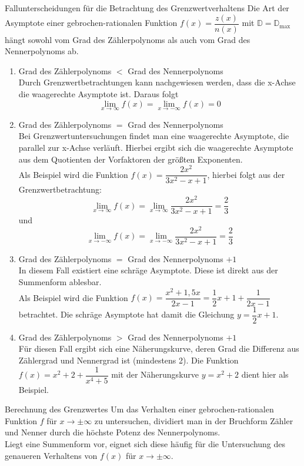 \begin{merke}{Fallunterscheidungen für die Betrachtung des Grenzwertverhaltens}{}
Die Art der Asymptote einer gebrochen-rationalen Funktion $f(x)=\dfrac{z(x)}{n(x)}$ mit $\mathds{D} = \mathds{D}_{\text{max}}$ hängt sowohl vom Grad des Zählerpolynoms als auch vom Grad des Nennerpolynoms ab.
\begin{enumerate}
    \item Grad des Zählerpolynoms $<$ Grad des Nennerpolynoms\\
    Durch Grenzwertbetrachtungen kann nachgewiesen werden, dass die x-Achse die waagerechte Asymptote ist. Daraus folgt $$\lim_{x\longrightarrow \infty} f(x) = \lim_{x\longrightarrow -\infty} f(x) = 0$$
\item  Grad des Zählerpolynoms $=$ Grad des Nennerpolynoms\\ Bei Grenzwertuntersuchungen findet man eine waagerechte Asymptote, die parallel zur x-Achse verläuft. Hierbei ergibt sich die waagerechte Asymptote aus dem Quotienten der Vorfaktoren der größten Exponenten.\\ Als Beispiel wird die Funktion $f(x)= \dfrac{2x^2}{3x^2-x+1}$, hierbei folgt aus der Grenzwertbetrachtung: $$\lim_{x\longrightarrow \infty} f(x) = \lim_{x\longrightarrow \infty} \dfrac{2x^2}{3x^2-x+1} = \dfrac{2}{3}$$ und $$\lim_{x\longrightarrow -\infty} f(x) = \lim_{x\longrightarrow -\infty} \dfrac{2x^2}{3x^2-x+1} = \dfrac{2}{3}$$
\item Grad des Zählerpolynoms $=$ Grad des Nennerpolynoms $+1$\\
In diesem Fall existiert eine schräge Asymptote. Diese ist direkt aus der Summenform ablesbar. \\ Als Beispiel wird die Funktion $f(x)= \dfrac{x^2+1,5x}{2x-1} = \dfrac{1}{2}x+1+\dfrac{1}{2x-1}$ betrachtet. Die schräge Asymptote hat damit die Gleichung $y= \dfrac{1}{2}x+1$.
\item Grad des Zählerpolynoms $>$ Grad des Nennerpolynoms $+1$\\
Für diesen Fall ergibt sich eine Näherungskurve, deren Grad die Differenz aus Zählergrad und Nennergrad ist (mindestens 2). Die Funktion\\ $f(x) = x^2+2+\dfrac{1}{x^4+5}$ mit der Näherungskurve $y= x^2+2$ dient hier als Beispiel.
\end{enumerate}
\end{merke}
\begin{b8d}{Berechnung des Grenzwertes}{}
Um das Verhalten einer gebrochen-rationalen Funktion $f$ für $x \longrightarrow \pm \infty$ zu untersuchen, dividiert man in der Bruchform Zähler und Nenner durch die höchste Potenz
des Nennerpolynoms.\\
Liegt eine Summenform vor, eignet sich diese häufig für die Untersuchung des
genaueren Verhaltens von $f(x)$ für $x \longrightarrow \pm \infty $.
\end{b8d}
